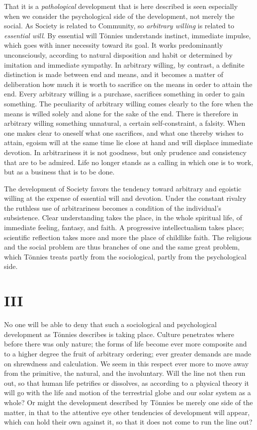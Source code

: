 \documentclass[12pt,a4paper,openany]{book}
\newcommand{\opage}[1]{\marginnote{\footnotesize\textit{[#1]}}}
\begin{document}
That it is a \emph{pathological} development that is here described
is seen especially when we consider the psychological side of
the development, not merely the social. As Society is related
to Community, so \emph{arbitrary willing} is related
to \emph{essential will}. By essential will Tönnies understands instinct,
\opage{148}immediate impulse, which goes with inner necessity
toward its goal. It works predominantly unconsciously, according to
natural disposition and habit or determined by imitation and
immediate sympathy. In arbitrary willing, by contrast, a
definite distinction is made between end and means, and it becomes a matter
of deliberation how much it is worth to sacrifice on the means
in order to attain the end. Every arbitrary willing is a purchase,
sacrifices something in order to gain something. The peculiarity of
arbitrary willing comes clearly to the fore when the means is willed solely
and alone for the sake of the end. There is therefore in
arbitrary willing something unnatural, a certain self-constraint, a
falsity. When one makes clear to oneself what one sacrifices,
and what one thereby wishes to attain, egoism will at the same time lie
close at hand and will displace immediate devotion. In
arbitrariness it is not goodness, but only prudence and
consistency that are to be admired. Life no longer stands
as a calling in which one is to work, but as a
business that is to be done.

The development of Society favors the tendency toward
arbitrary and egoistic willing at the expense of essential will and
devotion. Under the constant rivalry the ruthless use
of arbitrariness becomes a condition of the individual's
subsistence. Clear understanding takes the place, in the whole spiritual
life, of immediate feeling, fantasy, and faith.
A progressive intellectualism takes place; scientific
reflection takes more and more the place of
childlike faith. The religious and the social problem are
thus branches of one and the same great problem, which Tönnies
treats partly from the sociological, partly from the
psychological side.

\section*{III}

No one will be able to deny that such a
sociological and psychological development as Tönnies describes is taking place.
Culture penetrates where before there was only nature;
the forms of life become ever more composite and to a higher degree
the fruit of arbitrary ordering; ever greater
\opage{149}demands are made on shrewdness and calculation. We seem in this respect ever
more to move away from the primitive, the natural, and the involuntary.
Will the line not then run out, so that human life
petrifies or dissolves, as according to a physical theory it will
go with the life and motion of the terrestrial globe and our solar system
as a whole? Or might the development described by Tönnies
be merely one side of the matter, in that to the attentive
eye other tendencies of development will appear, which can
hold their own against it, so that it does not come to run
the line out?
\end{document}
